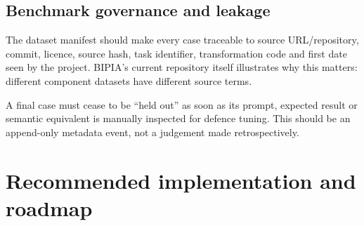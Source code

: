 \documentclass[11pt,a4paper]{article}
\begin{document}
\subsection*{Benchmark governance and leakage}
The dataset manifest should make every case traceable to source URL/repository, commit, licence, source hash, task identifier, transformation code and first date seen by the project. BIPIA's current repository itself illustrates why this matters: different component datasets have different source terms.\par
A final case must cease to be “held out” as soon as its prompt, expected result or semantic equivalent is manually inspected for defence tuning. This should be an append-only metadata event, not a judgement made retrospectively.\par
\section*{Recommended implementation and roadmap}
\end{document}
